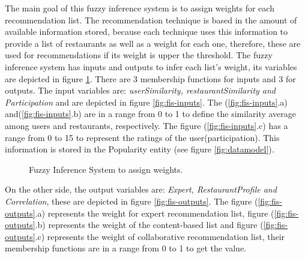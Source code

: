 The main goal of this fuzzy inference system is to assign weights for
each recommendation list. The recommendation technique is based in the
amount of available information stored, because each technique uses
this information to provide a list of restaurants as well as a weight
for each one, therefore, these are used for  recommendations if its
weight is upper the threshold.  The fuzzy inference system has inputs
and outputs to infer each list's weight, its variables are depicted in
figure \ref{fig:fis-pesos}.  There are 3 membership functions for
inputs and 3 for outputs. The input variables are:
\textit{userSimilarity, restaurantSimilarity and Participation} and
are depicted in figure \ref{fig:fis-inputs}. The (\ref{fig:fis-inputs}.a) 
and(\ref{fig:fis-inputs}.b) are in a range from 0 to 1 to
define the similarity average among users and restaurants,
respectively. The figure (\ref{fig:fis-inputs}.c) has a range from 0
to 15  to represent the ratings of the user(participation). This
information is stored in the Popularity entity (see figure
\ref{fig:datamodel}). \\
\begin{figure}
\captionsetup{justification=centering,margin=2cm,font=footnotesize}
\centering
{}
\caption{Fuzzy Inference System to assign weights.}
\label{fig:fis-pesos}       
\end{figure}
On the other side, the output variables are: \textit{Expert,
RestaurantProfile and Correlation}, these are depicted in figure
\ref{fig:fis-outputs}. The figure (\ref{fig:fis-outputs}.a) represents
the weight for expert recommendation list, figure (\ref{fig:fis-outputs}.b) 
represents the weight of the content-based list and figure
(\ref{fig:fis-outputs}.c) represents the weight of collaborative
recommendation list, their membership functions are in a range from 0
to 1 to get the value.
